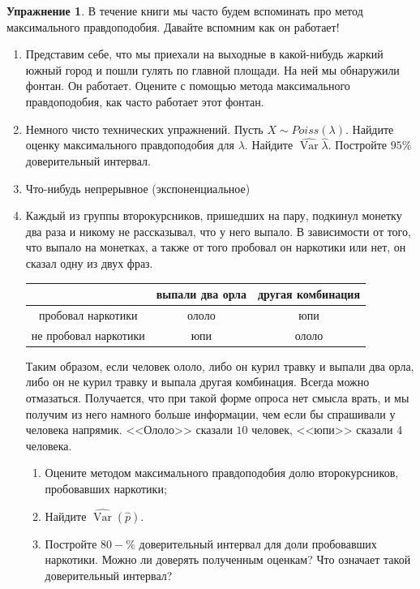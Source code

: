 \documentclass[12pt, a4paper, oneside]{extreport}
\DeclareMathOperator{\Var}{Var}
\theoremstyle{plain}              %
\theoremstyle{definition}         %
\newtheorem{problem}{\color{myblue} Упражнение}
\begin{document}
\begin{problem} 
В течение книги мы часто будем вспоминать про метод максимального правдоподобия. Давайте вспомним как он работает! 

\begin{enumerate}
	\item Представим себе, что мы приехали на выходные в какой-нибудь жаркий южный город и пошли гулять по главной площади. На ней мы обнаружили фонтан. Он работает. Оцените с помощью метода максимального правдоподобия, как часто работает этот фонтан. 
	
	\item 	Немного чисто технических упражнений. Пусть $X \sim Poiss(\lambda)$. Найдите оценку максимального правдоподобия для $\lambda$.  Найдите $\hat{\Var}{\hat \lambda}$. Постройте $95\%$ доверительный интервал. 


	\item  Что-нибудь непрерывное  (экспоненциальное)
	\item  Каждый из группы второкурсников, пришедших на пару, подкинул монетку два раза и никому не рассказывал, что у него выпало. В зависимости от того, что выпало на монетках, а также от того пробовал он наркотики или нет, он сказал одну из двух фраз.
	
	\begin{center}
		\begin{tabular}{c|c|c}
		                                 &  выпали два орла   & другая комбинация   \\ \hline
пробовал наркотики      &   ололо                     &   юпи       \\ \hline
не пробовал наркотики &	  юпи	                     &   ололо      \\
		\end{tabular}
	\end{center}
	
Таким образом, если человек ололо, либо он курил травку и выпали два орла, либо он не курил травку и выпала другая комбинация. Всегда можно отмазаться. Получается, что при такой форме опроса нет смысла врать, и мы получим из него намного больше информации, чем если бы спрашивали у человека напрямик.  <<Ололо>> сказали $10$ человек, <<юпи>> сказали $4$ человека.

\begin{enumerate}
	\item  Оцените методом максимального правдоподобия долю второкурсников, пробовавших наркотики;
	\item Найдите $\hat{\Var}(\hat p)$. 
	\item Постройте $80-\%$ доверительный интервал для доли пробовавших наркотики. Можно ли доверять полученным оценкам? Что означает такой доверительный интервал? 
\end{enumerate}


\end{enumerate}
\end{problem}
\end{document}
